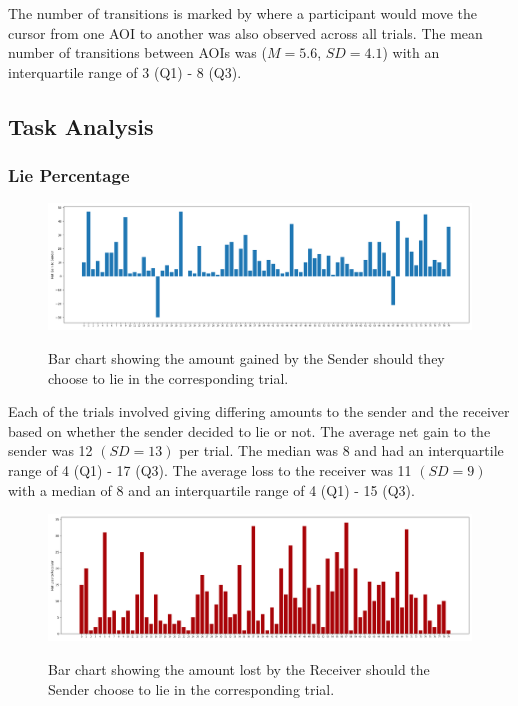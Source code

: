 \documentclass[man, floatsintext]{apa7}
\begin{document}
The number of transitions is marked by where a participant would move the cursor from one AOI to another was also observed across all trials. The mean number of transitions between AOIs was ($M = 5.6$, $SD = 4.1$) with an interquartile range of 3 (Q1) - 8 (Q3).


\subsection{Task Analysis}

\subsubsection{Lie Percentage}

\begin{figure}[H]
	\caption{Bar chart showing the amount gained by the Sender should they choose to lie in the corresponding trial.}
	\includegraphics[width=\linewidth]{../plots/TrialIndex/Gains.png}
	\label{fig:Gains}
\end{figure}

Each of the trials involved giving differing amounts to the sender and the receiver based on whether the sender decided to lie or not. The average net gain to the sender was 12 $(SD = 13)$ per trial. The median was 8 and had an interquartile range of 4 (Q1) - 17 (Q3). The average loss to the receiver was 11 $(SD = 9)$ with a median of 8 and an interquartile range of 4 (Q1) - 15 (Q3).

\begin{figure}[H]
	\caption{Bar chart showing the amount lost by the Receiver should the Sender choose to lie in the corresponding trial.}
	\includegraphics[width=\linewidth]{../plots/TrialIndex/Losses.png}
	\label{fig:Losses}
\end{figure}
\end{document}
